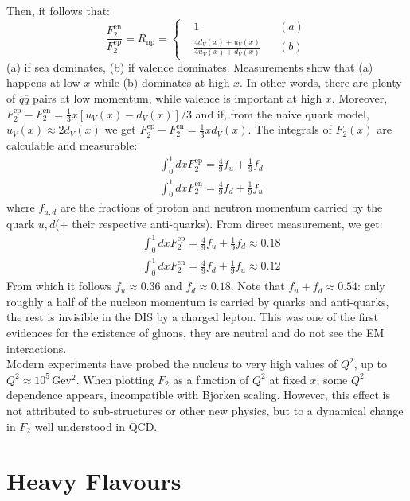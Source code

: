 \documentclass[10.75pt,a4paper,openright,bottom=2cm]{article}
\begin{document}
Then, it follows that:
\[
\frac{F_2^{\text{en}}}{F_2^{\text{ep}}}=R_{\text{np}}=\left\{\begin{aligned}&1 &&(a)\\
&\frac{4d_V(x)+u_V(x)}{4u_V(x)+d_V(x)} &&(b)\end{aligned}\right.
\]
(a) if sea dominates, (b) if valence dominates. Measurements show that (a) happens at low $x$ while (b) dominates at high $x$. In other words, there are plenty of $q\overline{q}$ pairs at low momentum, while valence is important at high $x$. Moreover, $F_2^{\text{ep}}-F_2^{\text{en}}=\frac{1}{3}x[u_V(x)-d_V(x)]/3$ and if, from the naive quark model, $u_V(x)\approx2d_V(x)$ we get $F_2^{\text{ep}}-F_2^{\text{en}}=\frac{1}{3}xd_V(x)$. The integrals of $F_2(x)$ are calculable and measurable:
\begin{align*}
&\int_0^1dxF_2^{\text{ep}}=\frac{4}{9}f_u+\frac{1}{9}f_d\\
&\int_0^1dxF_2^{\text{en}}=\frac{4}{9}f_d+\frac{1}{9}f_u
\end{align*}
where $f_{u,d}$ are the fractions of proton and neutron momentum carried by the quark $u,d$(+ their respective anti-quarks). From direct measurement, we get:
\begin{align*}
&\int_0^1dxF_2^{\text{ep}}=\frac{4}{9}f_u+\frac{1}{9}f_d\approx0.18\\
&\int_0^1dxF_2^{\text{en}}=\frac{4}{9}f_d+\frac{1}{9}f_u\approx0.12
\end{align*}
From which it follows $f_u\approx0.36$ and $f_d\approx0.18$. Note that $f_u+f_d\approx0.54$: only roughly a half of the nucleon momentum is carried by quarks and anti-quarks, the rest is invisible in the DIS by a charged lepton. This was one of the first evidences for the existence of gluons, they are neutral and do not see the EM interactions.\\
Modern experiments have probed the nucleus to very high values of $Q^2$, up to $Q^2\approx10^5$\,Gev$^2$. When plotting $F_2$ as a function of $Q^2$ at fixed $x$, some $Q^2$ dependence appears, incompatible with Bjorken scaling. However, this effect is not attributed to sub-structures or other new physics, but to a dynamical change in $F_2$ well understood in QCD.
\section{Heavy Flavours}
\end{document}

